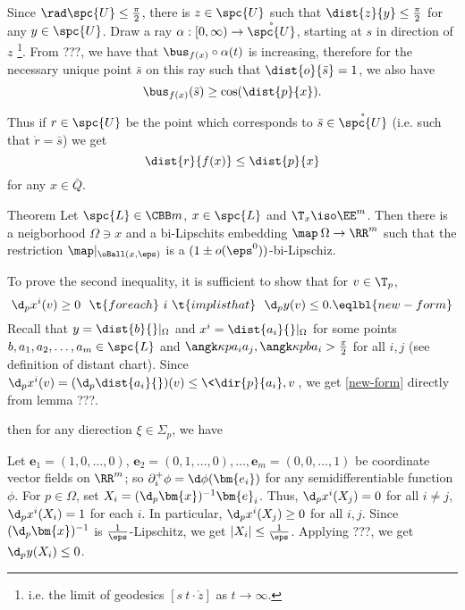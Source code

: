 {Since $\rad \spc{U}\le \tfrac\pi2$, there is $z\in \spc{U}$ such that $\dist{z}{y}\le\tfrac\pi2$ for any $y\in \spc{U}$.
Draw a ray $\alpha:[0,\infty)\to \mathring{\spc{U}}$, starting at $s$ in direction of $z$%
\footnote{i.e. the limit of geodesics $[s\ t\cdot\mathring z]$ as $t\to\infty$.}.
From ???, we have that $\bus_{f(x)}\circ\alpha(t)$ is increasing, therefore for the necessary unique point $\bar s$ on this ray such that $\dist{o}{\bar s}=1$, we also have 
$$\bus_{f(x)}(\bar s)\ge \cos(\dist{p}{x}).$$

Thus if $r\in \spc{U}$ be the point which corresponds to $\bar s\in \mathring{\spc{U}}$ (i.e. such that $\mathring r=\bar s$) we get 
$$\dist{r}{f(x)}
\le 
\dist{p}{x}$$
for any $x\in\bar Q$.\contradiction
\qeds














\begin{thm}{Theorem}
Let $\spc{L}\in\CBB m{}$, $x\in \spc{L}$ and $\T_x\iso\EE^m$.
Then there is a neigborhood $\Omega\ni x$ and a bi-Lipschits embedding $\map\:\Omega\to\RR^m$ such that 
the restriction $\map|_{\oBall(x,\eps)}$ is a $(1\pm o(\eps^0))$-bi-Lipschiz.
\end{thm}
















To prove the second inequality, 
it is sufficient to show that for $v\in\T_p$,
$$\d_p x^i(v)\ge 0
\ \ 
\t{for each}
\ i\ 
\t{implis that}
\ \ \d_p y(v)\le 0.\eqlbl{new-form}$$
Recall that $y=\dist{b}{}|_\Omega$ and $x^i=\dist{a_i}{}|_\Omega$  for some points $b,a_1,a_2,\dots,a_m\in \spc{L}$  and $\angk\kappa{p}{a_i}{a_j},\angk\kappa{p}{b}{a_i}>\tfrac\pi2$ for all $i,j$ (see definition of distant chart).
Since $\d_p x^i(v)=(\d_p\dist{a_i}{})(v)\le\<\dir{p}{a_i},v\>$, we get \ref{new-form} directly from lemma ???.

then for any dierection $\xi\in\Sigma_p$, we have 

Let $\bm{e}_1=(1,0,\dots,0)$, $\bm{e}_2=(0,1,\dots,0),\dots,\bm{e}_m=(0,0,\dots,1)$ be coordinate vector fields on $\RR^m$;
so $\partial^+_i\phi=\d\phi(\bm{e_i})$ for any semidifferentiable function $\phi$.
For $p\in\Omega$, set $X_i=(\d_p\bm{x})^{-1}\bm{e}_i$.
Thus, $\d_px^i(X_j)=0$ for all $i\not=j$,
$\d_px^i(X_i)=1$ for each $i$. 
In particular, $\d_px^i(X_j)\ge 0$ for all $i,j$.
Since $(\d_p\bm{x})^{-1}$ is $\tfrac{1}{\eps}$-Lipschitz, we get $|X_i|\le \tfrac1\eps$.
Applying ???, we get $\d_p y(X_i)\le 0$.

}

